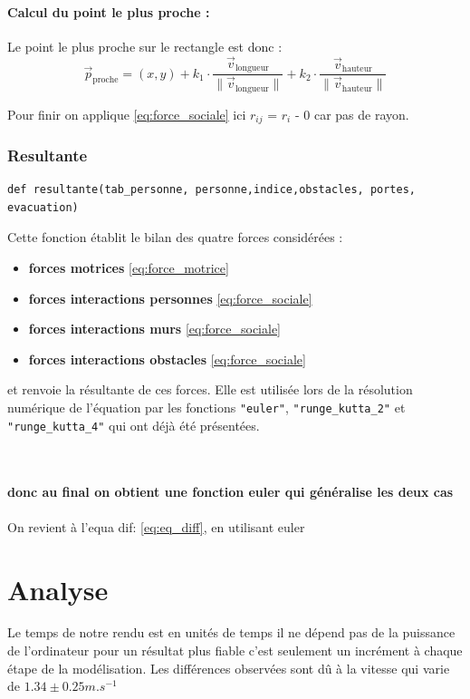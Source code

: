 \documentclass[a4paper,12pt]{article}
\begin{document}
\paragraph{Calcul du point le plus proche :}

Le point le plus proche sur le rectangle est donc :
\[
\vec{p}_{\text{proche}} = (x, y) + k_1 \cdot \frac{\vec{v}_{\text{longueur}}}{\|\vec{v}_{\text{longueur}}\|} + k_2 \cdot \frac{\vec{v}_{\text{hauteur}}}{\|\vec{v}_{\text{hauteur}}\|}
\]

Pour finir on applique \eqref{eq:force_sociale} ici $r_{ij}$ = $r_i$ - 0 car pas de rayon.

\subsubsection{Resultante}

\begin{verbatim}
def resultante(tab_personne, personne,indice,obstacles, portes, evacuation)
\end{verbatim}

Cette fonction établit le bilan des quatre forces considérées :
\begin{itemize}
	\item \textbf{forces motrices} \eqref{eq:force_motrice}
	\item \textbf{forces interactions personnes} \eqref{eq:force_sociale}
	\item \textbf{forces interactions murs} \eqref{eq:force_sociale}
 	\item \textbf{forces interactions obstacles} \eqref{eq:force_sociale}
\end{itemize}
et renvoie la résultante de ces forces. Elle est utilisée lors de la résolution numérique de l'équation par les fonctions \texttt{"euler"}, \texttt{"runge_kutta_2"} et \texttt{"runge_kutta_4"} qui ont déjà été présentées.

\\
\\
\textbf{donc au final on obtient une fonction euler qui généralise les deux cas}
\\
\\
On revient à l'equa dif: \eqref{eq:eq_diff}, en utilisant euler


\section{Analyse}
Le temps de notre rendu est en unités de temps il ne dépend pas de la puissance de l'ordinateur pour un résultat plus fiable c'est seulement un incrément à chaque étape de la modélisation. Les différences observées sont dû à la vitesse qui varie de $1.34 \pm 0.25 m.s^{-1}$
\end{document}
